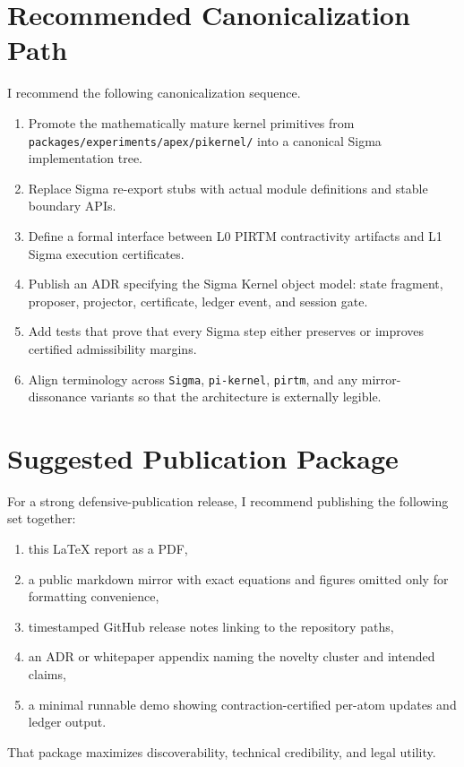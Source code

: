 \documentclass[11pt]{article}
\begin{document}
\section{Recommended Canonicalization Path}
I recommend the following canonicalization sequence.
\begin{enumerate}[leftmargin=2em]
    \item Promote the mathematically mature kernel primitives from \texttt{packages/experiments/apex/pikernel/} into a canonical Sigma implementation tree.
    \item Replace Sigma re-export stubs with actual module definitions and stable boundary APIs.
    \item Define a formal interface between L0 PIRTM contractivity artifacts and L1 Sigma execution certificates.
    \item Publish an ADR specifying the Sigma Kernel object model: state fragment, proposer, projector, certificate, ledger event, and session gate.
    \item Add tests that prove that every Sigma step either preserves or improves certified admissibility margins.
    \item Align terminology across \texttt{Sigma}, \texttt{pi-kernel}, \texttt{pirtm}, and any mirror-dissonance variants so that the architecture is externally legible.
\end{enumerate}

\section{Suggested Publication Package}
For a strong defensive-publication release, I recommend publishing the following set together:
\begin{enumerate}[leftmargin=2em]
    \item this LaTeX report as a PDF,
    \item a public markdown mirror with exact equations and figures omitted only for formatting convenience,
    \item timestamped GitHub release notes linking to the repository paths,
    \item an ADR or whitepaper appendix naming the novelty cluster and intended claims,
    \item a minimal runnable demo showing contraction-certified per-atom updates and ledger output.
\end{enumerate}

That package maximizes discoverability, technical credibility, and legal utility.
\end{document}
